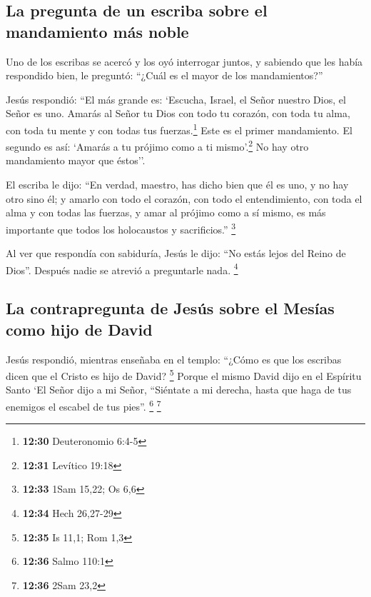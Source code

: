 \begin{paracol}{2}
\hypertarget{la-pregunta-de-un-escriba-sobre-el-mandamiento-muxe1s-noble}{%
\subsection{La pregunta de un escriba sobre el mandamiento más
noble}\label{la-pregunta-de-un-escriba-sobre-el-mandamiento-muxe1s-noble}}

 Uno de los escribas se acercó y los oyó interrogar
juntos, y sabiendo que les había respondido bien, le preguntó: ``¿Cuál
es el mayor de los mandamientos?''

 Jesús respondió: ``El más grande es: `Escucha, Israel,
el Señor nuestro Dios, el Señor es uno.  Amarás al Señor
tu Dios con todo tu corazón, con toda tu alma, con toda tu mente y con
todas tus fuerzas.\footnote{\textbf{12:30} Deuteronomio 6:4-5} Este es
el primer mandamiento.  El segundo es así: `Amarás a tu
prójimo como a ti mismo'.\footnote{\textbf{12:31} Levítico 19:18} No hay
otro mandamiento mayor que éstos''.

 El escriba le dijo: ``En verdad, maestro, has dicho bien
que él es uno, y no hay otro sino él;  y amarlo con todo
el corazón, con todo el entendimiento, con toda el alma y con todas las
fuerzas, y amar al prójimo como a sí mismo, es más importante que todos
los holocaustos y sacrificios.'' \footnote{\textbf{12:33} 1Sam 15,22; Os
  6,6}

 Al ver que respondía con sabiduría, Jesús le dijo: ``No
estás lejos del Reino de Dios''. Después nadie se atrevió a preguntarle
nada. \footnote{\textbf{12:34} Hech 26,27-29}

\hypertarget{la-contrapregunta-de-jesuxfas-sobre-el-mesuxedas-como-hijo-de-david}{%
\subsection{La contrapregunta de Jesús sobre el Mesías como hijo de
David}\label{la-contrapregunta-de-jesuxfas-sobre-el-mesuxedas-como-hijo-de-david}}

 Jesús respondió, mientras enseñaba en el templo: ``¿Cómo
es que los escribas dicen que el Cristo es hijo de David? \footnote{\textbf{12:35}
  Is 11,1; Rom 1,3}  Porque el mismo David dijo en el
Espíritu Santo `El Señor dijo a mi Señor, ``Siéntate a mi derecha, hasta
que haga de tus enemigos el escabel de tus pies''. \footnote{\textbf{12:36}
  Salmo 110:1} \footnote{\textbf{12:36} 2Sam 23,2}


\end{paracol}
